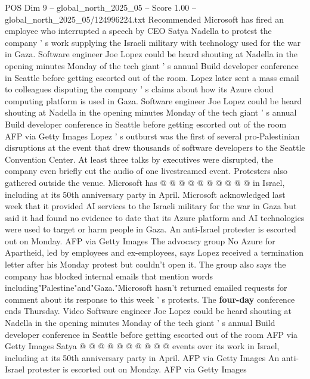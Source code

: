 \begin{textsample}{POS Dim 9 – global\_north\_2025\_05 – Score 1.00 – global\_north\_2025\_05/124996224.txt}  \label{ex:f9_pos_362}
Recommended Microsoft has fired an employee who interrupted a speech by CEO Satya Nadella to protest the company ' s work supplying the Israeli military with technology used for the war in Gaza.
Software engineer Joe Lopez could be heard shouting at Nadella in the opening minutes Monday of the tech giant ' s annual Build developer conference in Seattle before getting escorted out of the room.
Lopez later sent a mass email to colleagues disputing the company ' s claims about how its Azure cloud computing platform is used in Gaza.
Software engineer Joe Lopez could be heard shouting at Nadella in the opening minutes Monday of the tech giant ' s annual Build developer conference in Seattle before getting escorted out of the room AFP via Getty Images Lopez ' s outburst was the first of several pro-Palestinian disruptions at the event that drew thousands of software developers to the Seattle Convention Center.
At least three talks by executives were disrupted, the company even briefly cut the audio of one livestreamed event.
Protesters also gathered outside the venue.
Microsoft has @ @ @ @ @ @ @ @ @ @ in Israel, including at its 50th anniversary party in April.
Microsoft acknowledged last week that it provided AI services to the Israeli military for the war in Gaza but said it had found no evidence to date that its Azure platform and AI technologies were used to target or harm people in Gaza.
An anti-Israel protester is escorted out on Monday.
AFP via Getty Images The advocacy group No Azure for Apartheid, led by employees and ex-employees, says Lopez received a termination letter after his Monday protest but couldn't open it.
The group also says the company has blocked internal emails that mention words including"Palestine"and"Gaza."Microsoft hasn't returned emailed requests for comment about its response to this week ' s protests.
The \textbf{four-day} conference ends Thursday.
Video Software engineer Joe Lopez could be heard shouting at Nadella in the opening minutes Monday of the tech giant ' s annual Build developer conference in Seattle before getting escorted out of the room AFP via Getty Images Satya @ @ @ @ @ @ @ @ @ @ events over its work in Israel, including at its 50th anniversary party in April.
AFP via Getty Images An anti-Israel protester is escorted out on Monday.
AFP via Getty Images

\end{textsample}
